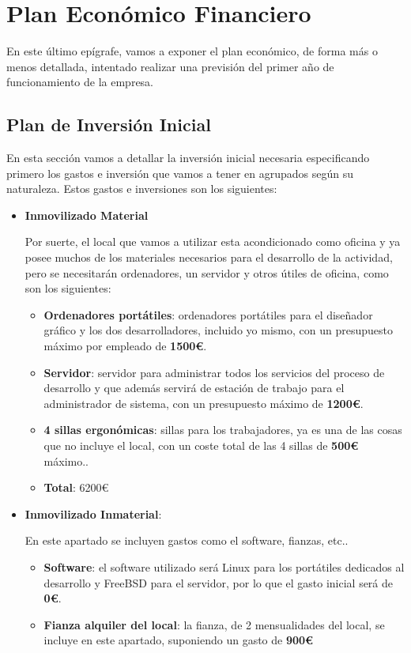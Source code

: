 \section{Plan Económico Financiero}
En este último epígrafe, vamos a exponer el plan económico, de forma más o menos detallada, intentado realizar una previsión del primer año de funcionamiento de la empresa.

\subsection{Plan de Inversión Inicial}
En esta sección vamos a detallar la inversión inicial necesaria especificando primero los gastos e inversión que vamos a tener en agrupados según su naturaleza. Estos gastos e inversiones son los siguientes:

\begin{itemize}
    \item \textbf{Inmovilizado Material}

    Por suerte, el local que vamos a utilizar esta acondicionado como oficina y ya posee muchos de los materiales necesarios para el
    desarrollo de la actividad, pero se necesitarán ordenadores, un servidor y otros útiles de oficina, como son los siguientes:
    \begin{itemize}
        \item \textbf{Ordenadores portátiles}: ordenadores portátiles para el diseñador gráfico y los dos desarrolladores, incluido yo mismo, con un presupuesto máximo por empleado de \textbf{1500€}.
        \item \textbf{Servidor}: servidor para administrar todos los servicios del proceso de desarrollo y que además servirá de estación de trabajo para el administrador de sistema, con un presupuesto máximo de \textbf{1200€}.
        \item \textbf{4 sillas ergonómicas}: sillas para los trabajadores, ya es una de las cosas que no incluye el local, con un coste total de las 4 sillas de \textbf{500€} máximo..

        \item \textbf{Total}: 6200€
    \end{itemize}
    \item \textbf{Inmovilizado Inmaterial}:


    En este apartado se incluyen gastos como el software, fianzas, etc..
    \begin{itemize}
          \item \textbf{Software}: el software utilizado será Linux para los portátiles dedicados al desarrollo y FreeBSD para el servidor, por lo que el gasto inicial será de \textbf{0€}.
          \item \textbf{Fianza alquiler del local}: la fianza, de 2 mensualidades del local, se incluye en este apartado, suponiendo un gasto de \textbf{900€}


\end{itemize}
\end{itemize}
